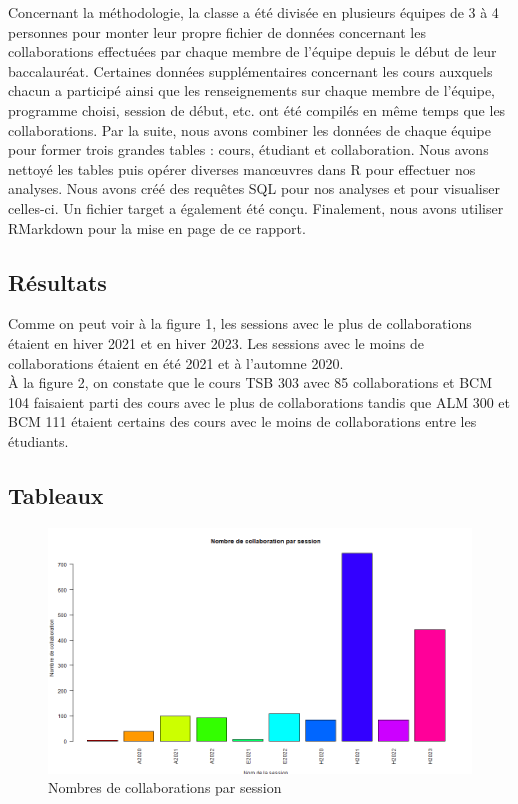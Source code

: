 \documentclass[9pt,twocolumn,twoside,]{pnas-new}
\begin{document}
Concernant la méthodologie, la classe a été divisée en plusieurs équipes
de 3 à 4 personnes pour monter leur propre fichier de données concernant
les collaborations effectuées par chaque membre de l'équipe depuis le
début de leur baccalauréat. Certaines données supplémentaires concernant
les cours auxquels chacun a participé ainsi que les renseignements sur
chaque membre de l'équipe, programme choisi, session de début, etc. ont
été compilés en même temps que les collaborations. Par la suite, nous
avons combiner les données de chaque équipe pour former trois grandes
tables : cours, étudiant et collaboration. Nous avons nettoyé les tables
puis opérer diverses manœuvres dans R pour effectuer nos analyses. Nous
avons créé des requêtes SQL pour nos analyses et pour visualiser
celles-ci. Un fichier target a également été conçu. Finalement, nous
avons utiliser RMarkdown pour la mise en page de ce rapport.

\hypertarget{Ruxe9sultats}{%
\subsection*{Résultats}\label{Ruxe9sultats}}

Comme on peut voir à la figure 1, les sessions avec le plus de
collaborations étaient en hiver 2021 et en hiver 2023. Les sessions avec
le moins de collaborations étaient en été 2021 et à l'automne 2020.\\
À la figure 2, on constate que le cours TSB 303 avec 85 collaborations
et BCM 104 faisaient parti des cours avec le plus de collaborations
tandis que ALM 300 et BCM 111 étaient certains des cours avec le moins
de collaborations entre les étudiants.

\hypertarget{references}{%
\subsection*{Tableaux}\label{references}}

\begin{figure}
  \centering
  \includegraphics[width=\linewidth]{session.png}
  \caption{Nombres de collaborations par session}
  \label{fig:session}
\end{figure}
\end{document}
